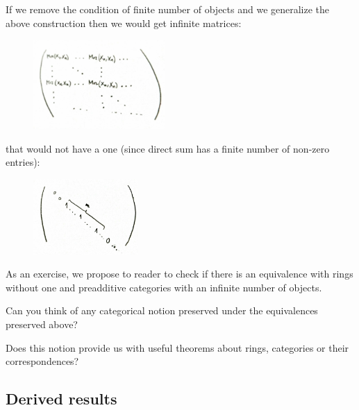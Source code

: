\begin{exercise}
If we remove the condition of finite number of objects and we generalize the above construction then we would get infinite matrices:

\begin{figure}[H]
\centering
\includegraphics[width=5cm]{images/infinite.jpg}
\end{figure}


that would not have a one (since direct sum has a finite number of non-zero entries):

\begin{figure}[H]
\centering
\includegraphics[width=4cm]{images/one.jpg}
\end{figure}

As an exercise, we propose to reader to check if there is an equivalence with rings without one and preadditive categories with an infinite number of objects. 
\end{exercise}

\begin{exercise}
Can you think of any categorical notion preserved under the equivalences preserved above?

Does this notion provide us with useful theorems about rings, categories or their correspondences?
\end{exercise}

\subsection{Derived results}


